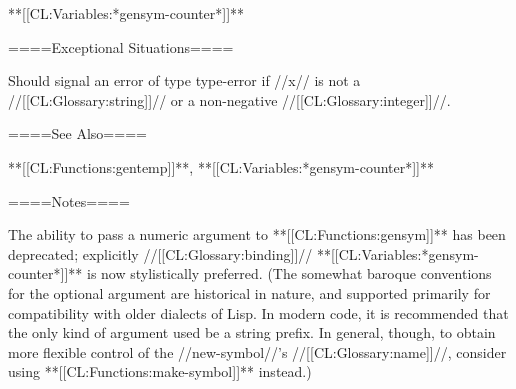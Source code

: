 **[[CL:Variables:*gensym-counter*]]**

====Exceptional Situations====

Should signal an error of type type-error if //x// is not a //[[CL:Glossary:string]]// or a non-negative //[[CL:Glossary:integer]]//.

====See Also====

**[[CL:Functions:gentemp]]**, **[[CL:Variables:*gensym-counter*]]**

====Notes====

The ability to pass a numeric argument to **[[CL:Functions:gensym]]** has been deprecated; explicitly //[[CL:Glossary:binding]]// **[[CL:Variables:*gensym-counter*]]** is now stylistically preferred. (The somewhat baroque conventions for the optional argument are historical in nature, and supported primarily for compatibility with older dialects of Lisp. In modern code, it is recommended that the only kind of argument used be a string prefix. In general, though, to obtain more flexible control of the //new-symbol//'s //[[CL:Glossary:name]]//, consider using **[[CL:Functions:make-symbol]]** instead.)

